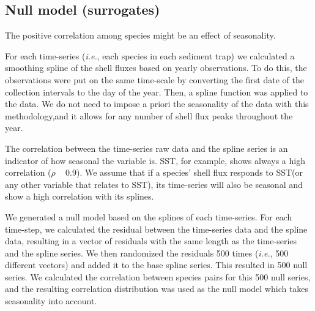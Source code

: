 \documentclass[a4paper]{article}
\begin{document}
\subsection{Null model (surrogates)}
The positive correlation among species might be an effect of seasonality. 

For each time-series (\textit{i.e.}, each species in each sediment trap) we calculated a smoothing spline of the shell fluxes based on yearly observations. To do this, the observations were put on the same time-scale by converting the first date of the collection intervals to the day of the year. Then, a spline function was applied to the data.
We do not need to impose a priori the seasonality of the data with this methodology,and it allows for any number of shell flux peaks throughout the year.

The correlation between the time-series raw data and the spline series is an indicator of how seasonal the variable is. SST, for example, shows always a high correlation ($\rho$ ~ 0.9). We assume that if a species' shell flux responds to SST(or any other variable that relates to SST), its time-series will also be seasonal and show a high correlation with its splines. 

We generated a null model based on the splines of each time-series. For each time-step, we calculated the residual between the time-series data and the spline data, resulting in a vector of residuals with the same length as the time-series and the spline series. We then randomized the residuals 500 times (\textit{i.e.}, 500 different vectors) and added it to the base spline series. This resulted in 500 null series. We calculated the correlation between species pairs for this 500 null series, and the resulting correlation distribution was used as the null model which takes seasonality into account. 
\end{document}
